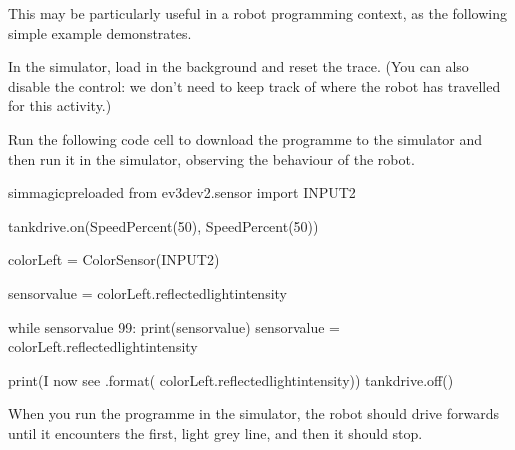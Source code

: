 \documentclass[letterpaper,10pt,english]{sphinxmanual}
\begin{document}
{This may be particularly useful in a robot programming context, as the following simple example demonstrates.

In the simulator, load in the  background and reset the trace. (You can also disable the  control: we don’t need to keep track of where the robot has travelled for this activity.)

Run the following code cell to download the programme to the simulator and then run it in the simulator, observing the behaviour of the robot.

{
\begin{sphinxVerbatim}[commandchars=\\\{\}]
\llap{\color{nbsphinxin}[ ]:\,\hspace{\fboxrule}\hspace{\fboxsep}}\PYGZpc{}\PYGZpc{}sim\PYGZus{}magic\PYGZus{}preloaded
from ev3dev2.sensor import INPUT\PYGZus{}2

tank\PYGZus{}drive.on(SpeedPercent(50), SpeedPercent(50))

colorLeft = ColorSensor(INPUT\PYGZus{}2)

sensor\PYGZus{}value = colorLeft.reflected\PYGZus{}light\PYGZus{}intensity

while sensor\PYGZus{}value \PYGZgt{} 99:
    print(sensor\PYGZus{}value)
    sensor\PYGZus{}value = colorLeft.reflected\PYGZus{}light\PYGZus{}intensity

print(\PYGZdq{}I now see \PYGZob{}\PYGZcb{}\PYGZdq{}.format( colorLeft.reflected\PYGZus{}light\PYGZus{}intensity))
tank\PYGZus{}drive.off()
\end{sphinxVerbatim}
}

When you run the programme in the simulator, the robot should drive forwards until it encounters the first, light grey line, and then it should stop.


}
\end{document}
